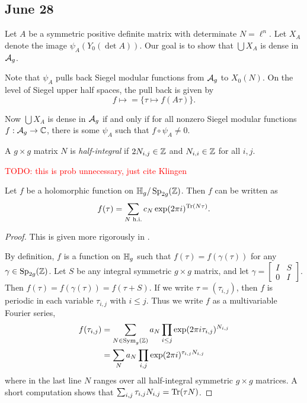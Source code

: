 \documentclass{amsart}
\begin{document}
\subsection{June 28}

Let $A$ be a symmetric positive definite matrix with determinate $N = \ell^n$. Let $X_A$ denote the image $\psi_A(Y_0(\det A))$. Our goal is to show that $\bigcup X_A$ is dense in $\mathcal{A}_g$.

Note that $\psi_A$ pulls back Siegel modular functions from $\mathcal{A}_g$ to $X_0(N)$. On the level of Siegel upper half spaces, the pull back is given by
\[
  f \mapsto = \{\tau \mapsto f(A\tau)\}.
\]

Now $\bigcup X_A$ is dense in $\mathcal{A}_g$ if and only if for all nonzero Siegel modular functions $f: \mathcal{A}_g \to \mathbb{C}$, there is some $\psi_A$ such that $f \circ \psi_A \neq 0$.

\begin{definition}
  A $g \times g$ matrix $N$ is \emph{half-integral} if $2N_{i,j} \in \mathbb{Z}$ and $N_{i,i} \in \mathbb{Z}$ for all $i,j$.
\end{definition}

\textcolor{red}{TODO: this is prob unnecessary, just cite Klingen}

\begin{lemma}
  Let $f$ be a holomorphic function on $\mathbb{H}_g/\operatorname{Sp}_{2g}(\mathbb{Z})$. Then $f$ can be written as
  \[
    f(\tau) = \sum_{N \text{ h.i.}} c_N \exp(2 \pi i)^{\operatorname{Tr}(N\tau)}.
  \]
\end{lemma}
\begin{proof}
  This is given more rigorously in \cite[Pg.~44]{klingen1990introductory}.

  By definition, $f$ is a function on $\mathbb{H}_g$ such that $f(\tau) = f(\gamma(\tau))$ for any $\gamma \in \operatorname{Sp}_{2g}(\mathbb{Z})$. Let $S$ be any integral symmetric $g \times g$ matrix, and let $\gamma = \begin{bmatrix} I & S \\ 0 & I \end{bmatrix}$. Then $f(\tau) = f(\gamma(\tau)) = f(\tau + S)$. If we write $\tau = (\tau_{i,j})$, then $f$ is periodic in each variable $\tau_{i,j}$ with $i \leq j$. Thus we write $f$ as a multivariable Fourier series,
  \begin{align*}
    f(\tau_{i,j})
    &=
    \sum_{N \in \mathrm{Sym}_g(\mathbb{Z})} a_N \prod_{i \leq j} \exp(2 \pi i \tau_{i,j})^{N_{i,j}}
    \\
    &=
    \sum_{N} a_N \prod_{i,j} \exp(2 \pi i)^{\tau_{i,j} N_{i,j}}
  \end{align*}
  where in the last line $N$ ranges over all half-integral symmetric $g \times g$ matrices. A short computation shows that $\sum_{i,j}\tau_{i,j}N_{i,j} = \operatorname{Tr}(\tau N)$.
\end{proof}
\end{document}
